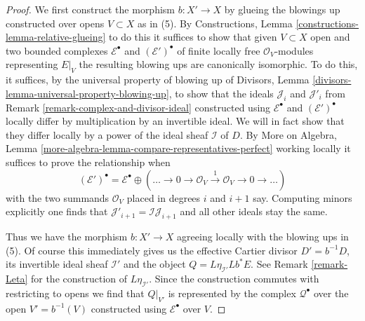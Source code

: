 \begin{proof}
We first construct the morphism $b : X' \to X$ by glueing the blowings up
constructed over opens $V \subset X$ as in (5). By
Constructions, Lemma \ref{constructions-lemma-relative-glueing}
to do this it suffices to show that given $V \subset X$ open
and two bounded complexes $\mathcal{E}^\bullet$
and $(\mathcal{E}')^\bullet$ of finite locally free $\mathcal{O}_V$-modules
representing $E|_V$ the resulting blowing ups are canonically isomorphic.
To do this, it suffices, by the universal property of blowing up
of Divisors, Lemma \ref{divisors-lemma-universal-property-blowing-up},
to show that the ideals $\mathcal{J}_i$ and $\mathcal{J}'_i$ from
Remark \ref{remark-complex-and-divisor-ideal}
constructed using $\mathcal{E}^\bullet$ and $(\mathcal{E}')^\bullet$ 
locally differ by multiplication by an invertible ideal.
We will in fact show that they differ locally by a power of the
ideal sheaf $\mathcal{I}$ of $D$. By More on Algebra, Lemma
\ref{more-algebra-lemma-compare-representatives-perfect}
working locally it suffices to prove the relationship when
$$
(\mathcal{E}')^\bullet =
\mathcal{E}^\bullet \oplus ( \ldots \to 0 \to
\mathcal{O}_V \xrightarrow{1} \mathcal{O}_V \to 0 \to \ldots)
$$
with the two summands $\mathcal{O}_V$ placed in degrees $i$ and $i + 1$ say.
Computing minors explicitly one finds that
$\mathcal{J}'_{i + 1} = \mathcal{I}\mathcal{J}_{i + 1}$
and all other ideals stay the same.

\medskip\noindent
Thus we have the morphism $b : X' \to X$ agreeing locally with the
blowing ups in (5). Of course this immediately gives us the
effective Cartier divisor $D' = b^{-1}D$, its invertible ideal sheaf
$\mathcal{I}'$ and the object $Q = L\eta_{\mathcal{I}'}Lb^*E$.
See Remark \ref{remark-Leta} for the construction of $L\eta_{\mathcal{I}'}$.
Since the construction commutes with restricting to opens we find
that $Q|_{V'}$ is represented by the complex
$\mathcal{Q}^\bullet$ over the open $V' = b^{-1}(V)$ constructed
using $\mathcal{E}^\bullet$ over $V$.


\end{proof}
